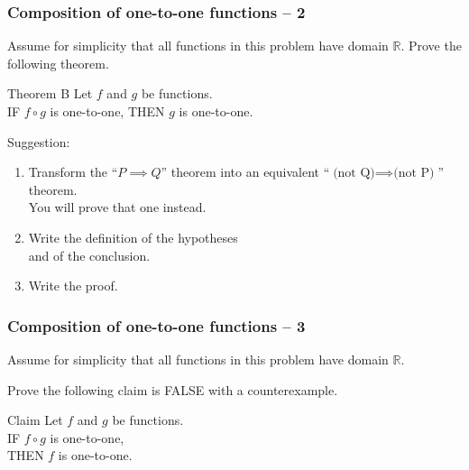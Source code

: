 \documentclass[14pt]{beamer}
\begin{document}
\begin{frame}[t]
	\frametitle{Composition of one-to-one functions -- 2}

	Assume for simplicity that all functions in this problem have domain
	$\mathbb{R}$. Prove the following theorem.

	\begin{block}{Theorem B}
		Let $f$ and $g$ be functions. \\ IF $f \circ g$ is one-to-one, \quad THEN $g$
		is one-to-one.
	\end{block}

	Suggestion:
	\begin{enumerate}
		\item Transform the ``$\displaystyle P \implies Q$'' theorem into an equivalent
			``$\displaystyle \text{(not Q)}\implies \text{(not P)}$'' theorem. \\ You
			will prove that one instead.

		\item Write the definition of the hypotheses \\ and of the conclusion.

		\item Write the proof.
	\end{enumerate}
\end{frame}

\begin{frame}[t]
	\frametitle{Composition of one-to-one functions -- 3}

	Assume for simplicity that all functions in this problem have domain
	$\mathbb{R}$.

	\vfill

	Prove the following claim is FALSE with a counterexample.

	\vfill

	\begin{block}{Claim }
		Let $f$ and $g$ be functions. \\ IF $f \circ g$ is one-to-one, \\ THEN $f$ is
		one-to-one.
	\end{block}

	\vfill
\end{frame}
\end{document}
